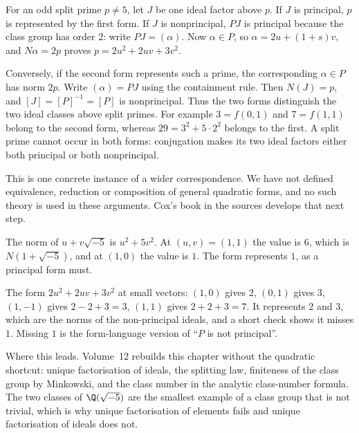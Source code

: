 For an odd split prime $p\ne5$, let $J$ be one ideal factor above $p$.
If $J$ is principal, $p$ is represented by the first form.
If $J$ is nonprincipal, $PJ$ is principal because the class group has
order $2$: write $PJ=(\alpha)$. Now $\alpha\in P$, so
$\alpha=2u+(1+s)v$, and $N\alpha=2p$ proves
$p=2u^2+2uv+3v^2$.

Conversely, if the second form represents such a prime, the corresponding
$\alpha\in P$ has norm $2p$. Write $(\alpha)=PJ$ using the containment
rule. Then $N(J)=p$, and $[J]=[P]^{-1}=[P]$ is nonprincipal.
Thus the two forms distinguish the two ideal classes above split primes.
For example $3=f(0,1)$ and $7=f(1,1)$ belong to the second form,
whereas $29=3^2+5\cdot2^2$ belongs to the first.
A split prime cannot occur in both forms: conjugation makes its two
ideal factors either both principal or both nonprincipal.

This is one concrete instance of a wider correspondence.
We have not defined equivalence, reduction or composition of general
quadratic forms, and no such theory is used in these arguments.
Cox's book in the sources develops that next step.

\begin{examplex}
The norm of $u+v\sqrt{-5}$ is $u^2+5v^2$. At $(u,v)=(1,1)$ the value is $6$, which is $N(1+\sqrt{-5})$, and at $(1,0)$ the value is $1$. The form represents $1$, as a principal form must.
\end{examplex}

\begin{examplex}
The form $2u^2+2uv+3v^2$ at small vectors: $(1,0)$ gives $2$, $(0,1)$ gives $3$, $(1,-1)$ gives $2-2+3=3$, $(1,1)$ gives $2+2+3=7$. It represents $2$ and $3$, which are the norms of the non-principal ideals, and a short check shows it misses $1$. Missing $1$ is the form-language version of ``$P$ is not principal''.
\end{examplex}

\begin{beauty}
Where this leads. Volume~12 rebuilds this chapter without the quadratic shortcut: unique factorisation of ideals, the splitting law, finiteness of the class group by Minkowski, and the class number in the analytic class-number formula. The two classes of $\Q(\sqrt{-5})$ are the smallest example of a class group that is not trivial, which is why unique factorisation of elements fails and unique factorisation of ideals does not.
\end{beauty}

